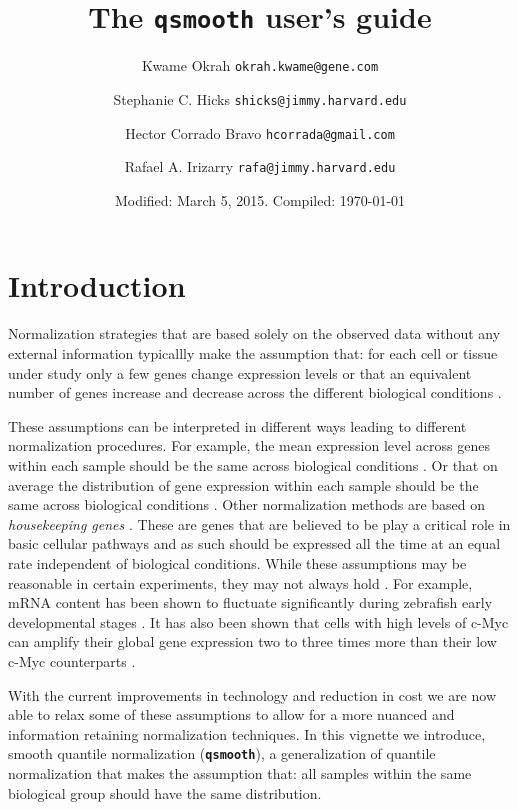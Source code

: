 \documentclass{article}\usepackage[]{graphicx}\usepackage[usenames,dvipsnames]{color}
\title{The \texttt{qsmooth} user's guide}
\author{Kwame Okrah \texttt{okrah.kwame@gene.com} \and
Stephanie C. Hicks \texttt{shicks@jimmy.harvard.edu} \and
Hector Corrado Bravo \texttt{hcorrada@gmail.com} \and
Rafael A. Irizarry \texttt{rafa@jimmy.harvard.edu} }
\date{Modified: March 5, 2015.  Compiled: \today}
\begin{document}
\maketitle
 
\tableofcontents

\section{Introduction}

Normalization strategies that are based solely 
on the observed data without any external information typicallly
make the assumption that: for each cell or tissue under study 
only a few genes change expression levels or that an equivalent 
number of genes increase and decrease across the different biological conditions
\cite{aanes2014normalization}.

These assumptions can be interpreted in different ways 
leading to different normalization procedures.
For example, the mean expression level across genes within 
each sample should be the same across biological conditions 
\cite{robinson2010scaling}.
Or that on average the distribution of gene expression within
each sample should be the same across biological conditions 
\cite{bolstad2003comparison}. 
Other normalization methods are based on {\it housekeeping genes}
\cite{eisenberg2013human}.
These are genes that are believed to be play a critical role 
in basic cellular pathways and as such should be 
expressed all the time at an equal rate independent of 
biological conditions.  
While these assumptions may be reasonable in certain
experiments, they may not always hold \cite{loven2012revisiting, hicks}.
For example, mRNA content has been shown to fluctuate significantly 
during zebrafish early developmental stages \cite{aanes2014normalization}.
It has also been shown that cells with high levels of c-Myc can amplify their 
global gene expression two to three times more than their low c-Myc 
counterparts \cite{loven2012revisiting}.

With the current improvements in technology and 
reduction in cost we are now able to relax some
of these assumptions to allow for a more
nuanced and information retaining normalization 
techniques.
In this vignette we introduce,
smooth quantile normalization (\texttt{\bf{qsmooth}}), 
a generalization of quantile normalization \cite{bolstad2003comparison}
that makes the assumption that: all samples within the same biological 
group should have the same distribution.
\end{document}
